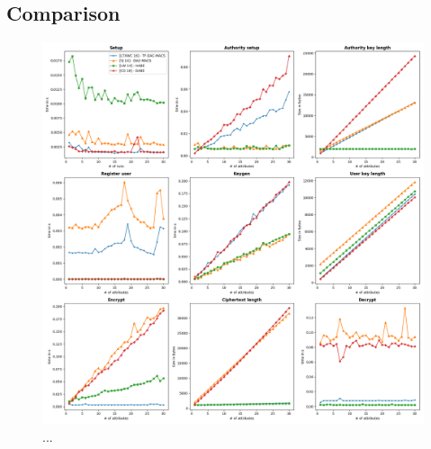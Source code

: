 \subsection{Comparison}
\begin{figure}[!ht]
\centering
    \includegraphics[width=1\linewidth]{img/maabe_comparisons.png}
    \caption{...}
    \label{fig:maabe_comparison}
\end{figure}